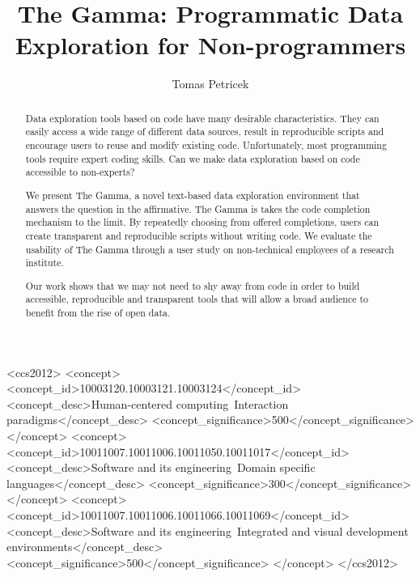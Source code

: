 \documentclass[manuscript,review,anonymous]{acmart}
\begin{document}
\title{The Gamma: Programmatic Data Exploration for Non-programmers}

\author{Tomas Petricek}

\begin{abstract}
Data exploration tools based on code have many desirable characteristics. They can easily access
a wide range of different data sources, result in reproducible scripts and encourage users to
reuse and modify existing code. Unfortunately, most programming tools require expert
coding skills. Can we make data exploration based on code accessible to non-experts?

We present The Gamma, a novel text-based data exploration environment that answers the question in
the affirmative. The Gamma is takes the code completion mechanism to the limit.
By repeatedly choosing from offered completions, users can create transparent and reproducible
scripts without writing code. We evaluate the usability of The Gamma through a user
study on non-technical employees of a research institute.

Our work shows that we may not need to shy away from code in order to build accessible,
reproducible and transparent tools that will allow a broad audience to benefit from the
rise of open data.
\end{abstract}

\begin{CCSXML}
<ccs2012>
   <concept>
       <concept_id>10003120.10003121.10003124</concept_id>
       <concept_desc>Human-centered computing~Interaction paradigms</concept_desc>
       <concept_significance>500</concept_significance>
       </concept>
   <concept>
       <concept_id>10011007.10011006.10011050.10011017</concept_id>
       <concept_desc>Software and its engineering~Domain specific languages</concept_desc>
       <concept_significance>300</concept_significance>
       </concept>
   <concept>
       <concept_id>10011007.10011006.10011066.10011069</concept_id>
       <concept_desc>Software and its engineering~Integrated and visual development environments</concept_desc>
       <concept_significance>500</concept_significance>
       </concept>
 </ccs2012>
\end{CCSXML}

\end{document}
